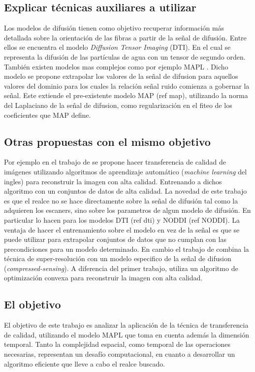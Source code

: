 \documentclass[a4paper,10pt]{article}
\begin{document}
\subsection{Explicar técnicas auxiliares a utilizar}
Los modelos de difusión tienen como objetivo recuperar información más detallada sobre la orientación de las fibras a 
partir de la señal de difusión. Entre ellos se encuentra el modelo \textit{Diffusion Tensor Imaging} (DTI). En el cual 
se representa la difusión de las partículas de agua con un tensor de segundo orden. También existen modelos mas 
complejos como por ejemplo MAPL \citep{Fick2016365}. Dicho modelo se propone extrapolar los 
valores de la se\~nal de difusion para aquellos valores del dominio para los cuales la relaci\'on 
se\~nal ruido comienza a gobernar la se\~nal. Este extiende el pre-existente modelo MAP (ref 
map), utilizando la norma del Laplaciano de la se\~nal de difusion, como regularizaci\'on en el 
fiteo de los coeficientes que MAP define.


\subsection{Otras propuestas con el mismo objetivo}
Por ejemplo en el trabajo de \citet{Alexander2014} se propone hacer transferencia de 
calidad de imágenes utilizando algoritmos de aprendizaje automático 
(\textit{machine learning} del ingles) para reconstruir la imagen con alta 
calidad. Entrenando a dichos algoritmo con un conjuntos de datos de alta 
calidad. La novedad de este trabajo es que el realce no se hace directamente 
sobre la señal de difusión tal como la adquieren los escaners, sino sobre los 
parametros de algun modelo de difusión. En particular lo hacen para los modelos DTI 
(ref dti) y NODDI (ref NODDI). La ventaja de hacer el entrenamiento sobre el modelo en vez de la 
se\~nal es que se puede utilizar para extrapolar conjuntos de datos que no cumplan con 
las precondiciones para un modelo determinado. En cambio el trabajo de \citet{Ning2016} combina la 
t\'ecnica de super-resolución con un modelo especifico de la señal de difusion 
(\textit{compressed-sensing}). A diferencia del primer trabajo, utiliza un algoritmo de 
optimización convexa para reconstruir la imagen con alta calidad.

\subsection{El objetivo}
El objetivo de este trabajo es analizar la aplicación de la técnica de 
transferencia de calidad, utilizando el modelo MAPL que toma en cuenta además 
la dimensión temporal. Tanto la complejidad espacial, como temporal de las 
operaciones necesarias, representan un desafío computacional, en cuanto a 
desarrollar un algoritmo eficiente que lleve a cabo el realce buscado.





\clearpage


\end{document}
